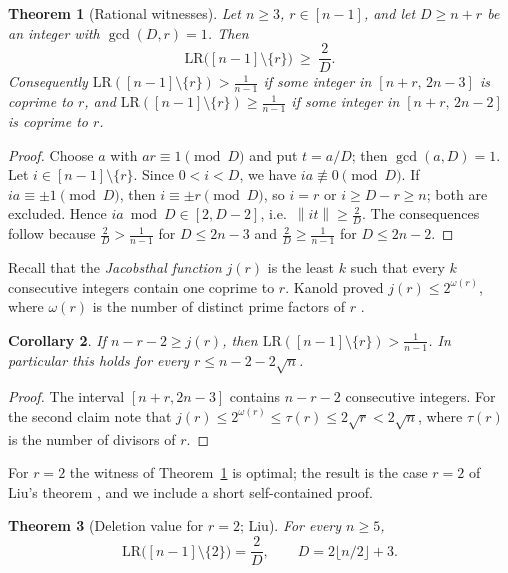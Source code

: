 \documentclass[11pt]{article}
\newtheorem{theorem}{Theorem}[section]
\newtheorem{corollary}[theorem]{Corollary}
\theoremstyle{definition}
\newcommand{\LR}{\mathrm{LR}}
\newcommand{\norm}[1]{\left\lVert #1 \right\rVert}
\begin{document}
\begin{theorem}[Rational witnesses]\label{thm:delwit}
Let $n\ge3$, $r\in[n-1]$, and let $D\ge n+r$ be an integer with
$\gcd(D,r)=1$. Then
\[
\LR\bigl([n-1]\setminus\{r\}\bigr)\ \ge\ \frac2D .
\]
Consequently $\LR([n-1]\setminus\{r\})>\frac1{n-1}$ if some integer in
$[n+r,\,2n-3]$ is coprime to $r$, and $\LR([n-1]\setminus\{r\})\ge
\frac1{n-1}$ if some integer in $[n+r,\,2n-2]$ is coprime to $r$.
\end{theorem}

\begin{proof}
Choose $a$ with $ar\equiv1\pmod D$ and put $t=a/D$; then
$\gcd(a,D)=1$. Let $i\in[n-1]\setminus\{r\}$. Since $0<i<D$, we have
$ia\not\equiv0\pmod D$. If $ia\equiv\pm1\pmod D$, then
$i\equiv\pm r\pmod D$, so $i=r$ or $i\ge D-r\ge n$; both are excluded.
Hence $ia\bmod D\in[2,D-2]$, i.e.\ $\norm{it}\ge\frac2D$. The
consequences follow because $\frac2D>\frac1{n-1}$ for $D\le2n-3$ and
$\frac2D\ge\frac1{n-1}$ for $D\le2n-2$.
\end{proof}

Recall that the \emph{Jacobsthal function} $j(r)$ is the least $k$ such
that every $k$ consecutive integers contain one coprime to $r$. Kanold
proved $j(r)\le2^{\omega(r)}$, where $\omega(r)$ is the number of
distinct prime factors of $r$ \cite{Kanold1967}.

\begin{corollary}\label{cor:delwit}
If $n-r-2\ge j(r)$, then $\LR([n-1]\setminus\{r\})>\frac1{n-1}$. In
particular this holds for every $r\le n-2-2\sqrt n$.
\end{corollary}

\begin{proof}
The interval $[n+r,2n-3]$ contains $n-r-2$ consecutive integers. For
the second claim note that
$j(r)\le2^{\omega(r)}\le\tau(r)\le2\sqrt r<2\sqrt n$, where $\tau(r)$ is
the number of divisors of $r$.
\end{proof}

For $r=2$ the witness of Theorem~\ref{thm:delwit} is optimal; the
result is the case $r=2$ of Liu's theorem \cite[Thm.~18]{Liu2008}, and we
include a short self-contained proof.

\begin{theorem}[Deletion value for $r=2$; Liu]\label{thm:r2closed}
For every $n\ge5$,
\[
\LR\bigl([n-1]\setminus\{2\}\bigr)=\frac{2}{D},\qquad
D=2\lfloor n/2\rfloor+3 .
\]
\end{theorem}
\end{document}
